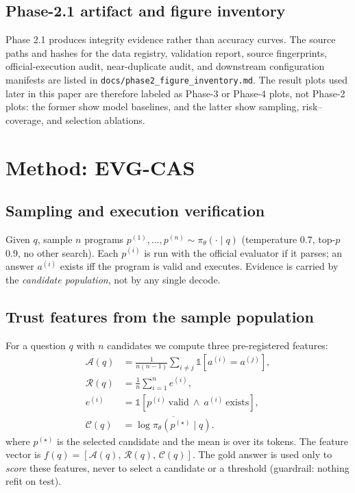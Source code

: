\documentclass[conference]{IEEEtran}
\newcommand{\ourmethod}{EVG-CAS}
\begin{document}
\subsection{Phase-2.1 artifact and figure inventory}
Phase 2.1 produces integrity evidence rather than accuracy curves. The source paths and
hashes for the data registry, validation report, source fingerprints, official-execution
audit, near-duplicate audit, and downstream configuration manifests are listed in
\texttt{docs/phase2\_figure\_inventory.md}. The result plots used later in this
paper are therefore labeled as Phase-3 or Phase-4 plots, not Phase-2 plots: the former show
model baselines, and the latter show sampling, risk--coverage, and selection ablations.

\section{Method: \ourmethod{}}\label{sec:method}

\subsection{Sampling and execution verification}
Given $q$, sample $n$ programs $p^{(1)},\dots,p^{(n)}\sim\pi_{\theta}(\cdot\mid q)$
(temperature 0.7, top-$p$ 0.9, no other search). Each $p^{(i)}$ is run with the official
evaluator if it parses; an answer $a^{(i)}$ exists iff the program is valid and executes.
Evidence is carried by the \emph{candidate population}, not by any single decode.

\subsection{Trust features from the sample population}
For a question $q$ with $n$ candidates we compute three pre-registered features:
\begin{align}
  \mathcal{A}(q) &= \frac{1}{n(n-1)}\sum_{i\neq j}
    \mathbb{1}[a^{(i)} = a^{(j)}],\\
  \mathcal{R}(q) &= \frac{1}{n}\sum_{i=1}^{n} e^{(i)},\\
  e^{(i)} &= \mathbb{1}[p^{(i)}\ \text{valid}\ \wedge\ a^{(i)}\ \text{exists}],\\
  \mathcal{C}(q) &= \overline{\log\pi_{\theta}(p^{(\star)}\mid q)}.
\end{align}
where $p^{(\star)}$ is the selected candidate and the mean is over its tokens.
The feature vector is $f(q)=[\mathcal{A}(q),\,\mathcal{R}(q),\,\mathcal{C}(q)]$. The gold
answer is used only to \emph{score} these features, never to select a candidate or a
threshold (guardrail: nothing refit on test).
\end{document}
